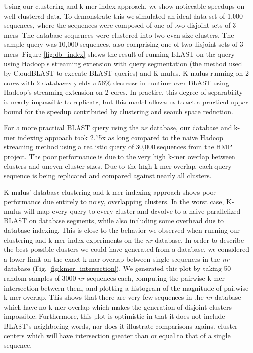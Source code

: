 Using our clustering and k-mer index approach, we show noticeable speedups on well clustered data.
To demonstrate this we simulated an ideal data set of 1,000 sequences, where the sequences were composed of one of two disjoint sets of 3-mers.
The database sequences were clustered into two even-size clusters.
The sample query was 10,000 sequences, also comprising one of two disjoint sets of 3-mers.
Figure \ref{fig:db_index} shows the result of running BLAST on the query using Hadoop's streaming extension with query segmentation (the method used by CloudBLAST to execute BLAST queries) and K-mulus.
K-mulus running on 2 cores with 2 databases yields a 56\% decrease in runtime over BLAST using Hadoop's streaming extension on 2 cores.
In practice, this degree of separability is nearly impossible to replicate, but this model allows us to set a practical upper bound for the speedup contributed by clustering and search space reduction.

For a more practical BLAST query using the \emph{nr} database, our database and k-mer indexing approach took 2.75x as long compared to the naive Hadoop streaming method using a realistic query of 30,000 sequences from the HMP project. The poor performance is due to the very high k-mer overlap between clusters and uneven cluster sizes.
Due to the high k-mer overlap, each query sequence is being replicated and compared against nearly all clusters.

K-mulus' database clustering and k-mer indexing approach shows poor performance due entirely to noisy, overlapping clusters. In the worst case, K-mulus will map every query to every cluster and devolve to a naive parallelized BLAST on database segments, while also including some overhead due to database indexing. This is close to the behavior we observed when running our clustering and k-mer index experiments on the \emph{nr} database. In order to describe the best possible clusters we could have generated from a database, we considered a lower limit on the exact k-mer overlap between single sequences in the \emph{nr} database (Fig. \ref{fig:kmer_intersection}). We generated this plot by taking 50 random samples of 3000 \emph{nr} sequences each, computing the pairwise k-mer intersection between them, and plotting a histogram of the magnitude of pairwise k-mer overlap. This shows that there are very few sequences in the \emph{nr} database which have no k-mer overlap which makes the generation of disjoint clusters impossible. Furthermore, this plot is optimistic in that it does not include BLAST’s neighboring words, nor does it illustrate comparisons against cluster centers which will have intersection greater than or equal to that of a single sequence.

